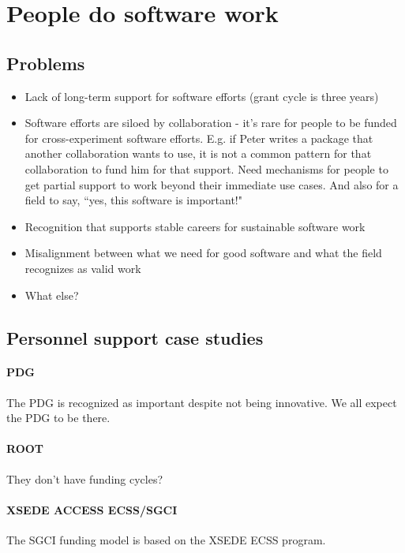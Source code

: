 \section{People do software work} 

\subsection{Problems}
\begin{itemize}
    \item Lack of long-term support for software efforts (grant cycle is three years)
    \item Software efforts are siloed by collaboration - it's rare for people to be funded for cross-experiment software efforts.  E.g. if Peter writes a package that another collaboration wants to use, it is not a common pattern for that collaboration to fund him for that support.  Need mechanisms for people to get partial support to work beyond their immediate use cases.  And also for a field to say, ``yes, this software is important!"
    \item Recognition that supports stable careers for sustainable software work
    \item Misalignment between what we need for good software and what the field recognizes as valid work
    \item What else?
\end{itemize}


\subsection{Personnel support case studies}
\paragraph{PDG}
The PDG is recognized as important despite not being innovative.  We all expect the PDG to be there.

\paragraph{ROOT}
They don't have funding cycles? \cite{Naumann:2022pub}

\paragraph{XSEDE ACCESS ECSS/SGCI}

The SGCI funding model is based on the XSEDE ECSS program.

